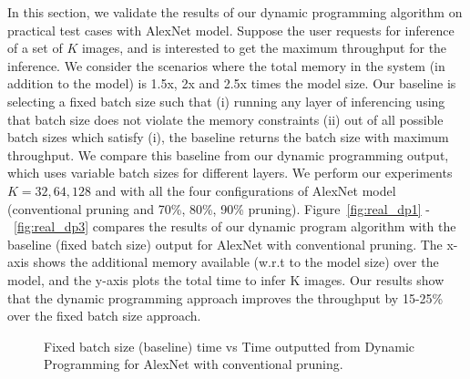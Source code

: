 In this section, we validate the results of our dynamic programming algorithm on practical test cases with AlexNet model.
Suppose the user requests for inference of a set of $K$ images, and is interested to get the maximum throughput for the inference.
We consider the scenarios where the total  memory in the system (in addition to the model) is 1.5x, 2x and 2.5x  times the model size.
Our baseline is selecting a fixed batch size such that (i) running any layer of inferencing using that batch size does not violate the
memory constraints (ii) out of all possible batch sizes which satisfy	 (i),  the baseline returns the batch size with maximum throughput.
We compare this baseline from our dynamic programming output, which uses variable batch sizes for different layers.
We perform our experiments $K =  32, 64, 128$ and with all the four configurations of AlexNet model (conventional pruning and
70\%, 80\%, 90\% pruning).
Figure~\ref{fig:real_dp1} - ~\ref{fig:real_dp3} compares the results of our dynamic program algorithm with the baseline 
(fixed batch size) output for AlexNet with conventional pruning. The x-axis shows the additional memory available (w.r.t to the model size)
over the model, and the y-axis plots the total time to infer K images. Our results show that the dynamic programming approach
improves the throughput  by 15-25\% over the fixed batch size approach.

\begin{figure*}[!tbp]
  \centering
  \hspace{3mm}
  \hspace{3mm}
  \caption{Fixed batch size (baseline) time vs Time outputted from Dynamic Programming for AlexNet with conventional pruning.}
\end{figure*}

 
   

